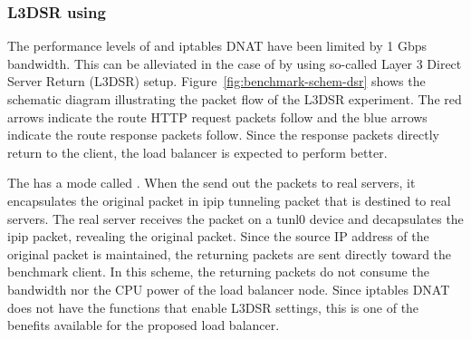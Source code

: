 

\FloatBarrier

\subsubsection{L3DSR using }

The performance levels of  and iptables DNAT have been limited by 1 Gbps bandwidth.
This can be alleviated in the case of  by using so-called Layer 3 Direct Server Return (L3DSR) setup.
Figure~\ref{fig:benchmark-schem-dsr} shows the schematic diagram illustrating the packet flow of the L3DSR experiment.
The red arrows indicate the route HTTP request packets follow and the blue arrows indicate the route response packets follow.
Since the response packets directly return to the client, the load balancer is expected to perform better.

The  has a mode called .
When the  send out the packets to real servers, it encapsulates the original packet in ipip tunneling packet \cite{kuznetsov1999tunnels} that is destined to real servers.
The real server receives the packet on a tunl0 device and decapsulates the ipip packet, revealing the original packet.
Since the source IP address of the original packet is maintained, the returning packets are sent directly toward the benchmark client.
In this scheme, the returning packets do not consume the bandwidth nor the CPU power of the load balancer node.
Since iptables DNAT does not have the functions that enable L3DSR settings, this is one of the benefits  available  for the proposed load balancer.

